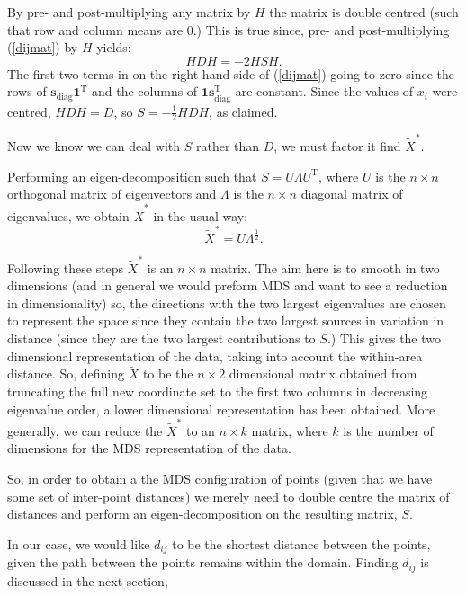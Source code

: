 \documentclass[a4paper,10pt]{article}
\newcommand{\eqn}[1]{(\ref{#1})}
\newcommand{\tr}[1]{#1^{\text{T}}}
\newcommand{\cross}{\times}
\begin{document}
By pre- and post-multiplying any matrix by $H$ the matrix is double centred (such that row and column means are 0.) This is true since, pre- and post-multiplying \eqn{dijmat} by $H$ yields:
\begin{equation}
HDH = -2HSH.
\label{eqH}
\end{equation}
The first two terms in on the right hand side of \eqn{dijmat} going to zero since the rows of $\mathbf{s}_\text{diag}\tr{\mathbf{1}}$ and the columns of  $\mathbf{1}\tr{\mathbf{s}_\text{diag}}$ are constant. Since the values of $x_i$ were centred, $HDH=D$, so $S = -\frac{1}{2}HDH$, as claimed.

Now we know we can deal with $S$ rather than $D$, we must factor it find $\tilde{X}^{*}$. 




Performing an eigen-decomposition such that $S=U\Lambda\tr{U}$, where $U$ is the $n \cross n$ orthogonal matrix of eigenvectors and $\Lambda$ is the $n \cross n$ diagonal matrix of eigenvalues, we obtain $\tilde{X}^*$ in the usual way:
\begin{equation}
\tilde{X}^*=U\Lambda^{\frac{1}{2}}.
\end{equation}

Following these steps $\tilde{X}^*$ is an $n \cross n$ matrix. The aim here is to smooth in two dimensions (and in general we would preform MDS and want to see a reduction in dimensionality) so, the directions with the two largest eigenvalues are chosen to represent the space since they contain the two largest sources in variation in distance (since they are the two largest contributions to $S$.) This gives the two dimensional representation of the data, taking into account the within-area distance. So, defining $\tilde{X}$ to be the $n \cross 2$ dimensional matrix obtained from truncating the full new coordinate set to the first two columns in decreasing eigenvalue order, a lower dimensional representation has been obtained. More generally, we can reduce the $\tilde{X}^*$ to an $n \cross k$ matrix, where $k$ is the number of dimensions for the MDS representation of the data.

So, in order to obtain a the MDS configuration of points (given that we have some set of inter-point distances) we merely need to double centre the matrix of distances and perform an eigen-decomposition on the resulting matrix, $S$. 


 In our case, we would like $d_{ij}$ to be the shortest distance between the points, given the path between the points remains within the domain. Finding $d_{ij}$ is discussed in the next section,
\end{document}
